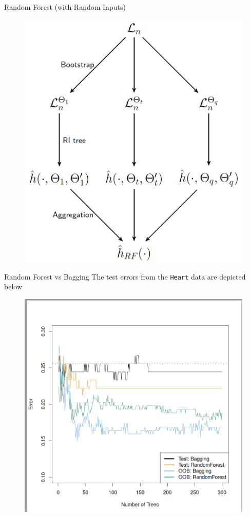 \documentclass{beamer}
\begin{document}
\begin{frame}{Random Forest (with Random Inputs)}
			 \begin{figure}[h]
		\centering
		\includegraphics[scale=0.4]{../../Figures/fig_random_forest_ri.png}
	\end{figure}
	

\end{frame}


\begin{frame}{Random Forest vs Bagging}
	The test errors from the {\tt Heart} data are depicted below
	 \begin{figure}[h]
		\centering
		\includegraphics[scale=0.35]{../../Figures/fig_bagging.png}
	\end{figure}
\end{frame}
\end{document}

